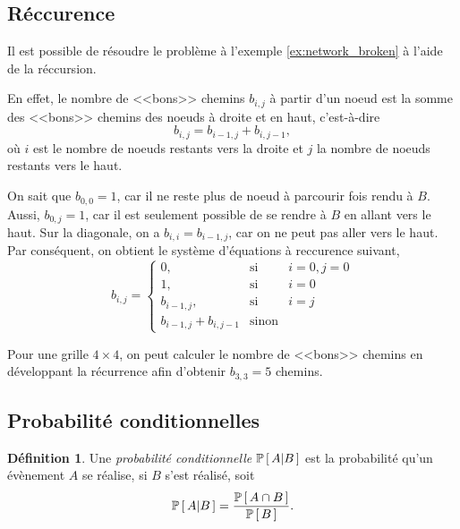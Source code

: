 \documentclass[11pt]{article}
\makeatletter
\renewcommand\P[1]{%
	\ensuremath{%
		\mathbb{P}\left[\,#1\,\right]%
	}%
}%
\newcommand\Pg[2]{%
	\ensuremath{%
		\mathbb{P}\left[\,#1\middle\rvert#2\,\right]%
	}%
}%
\theoremstyle{remark}
\theoremstyle{definition}
\newtheorem*{@definition}{Définition}
\newenvironment{definition}{%
	\begin{@definition}%
}{%
	\end{@definition}%
	\setcounter{property}{0}%
}
\makeatother
\begin{document}
\subsection{Réccurence}
\begin{exemple}
	Il est possible de résoudre le problème à l'exemple \ref{ex:network_broken}
	à l'aide de la réccursion.
	
	En effet, le nombre de <<bons>> chemins $b_{i,j}$ à partir d'un noeud est
	la somme des <<bons>> chemins des noeuds à droite et en haut, c'est-à-dire
	\begin{equation*}
		b_{i,j}=b_{i-1,j}+b_{i,j-1},
	\end{equation*}
	où $i$ est le nombre de noeuds restants vers la droite et $j$ la nombre de
	noeuds restants vers le haut.

	On sait que $b_{0,0}=1$, car il ne reste plus de noeud à parcourir fois
	rendu à $B$. Aussi, $b_{0,j}=1$, car il est seulement possible de se rendre
	à $B$ en allant vers le haut. Sur la diagonale, on a $b_{i,i}=b_{i-1,j}$,
	car on ne peut pas aller vers le haut. Par conséquent, on obtient le
	système d'équations à reccurence suivant,
	\begin{equation*}
		b_{i,j}=\left\{
			\begin{matrix}
				0,                 &\text{si}&i=0,j=0\\
				1,                 &\text{si}&i=0\\
				b_{i-1,j},         &\text{si}&i=j\\
				b_{i-1,j}+b_{i,j-1}&\text{sinon}
			\end{matrix}
		\right.
	\end{equation*}

	Pour une grille $4\times 4$, on peut calculer le nombre de <<bons>> chemins
	en développant la récurrence afin d'obtenir $b_{3,3}=5$ chemins.
\end{exemple}

\subsection{Probabilité conditionnelles}
\begin{definition}
	Une \textit{probabilité conditionnelle} $\Pg{A}{B}$ est la probabilité
	qu'un évènement $A$ se réalise, si $B$ s'est réalisé, soit
	\begin{equation*}
		\Pg{A}{B}=\frac{\P{A\cap B}}{\P{B}}.
	\end{equation*}
\end{definition}
\end{document}
